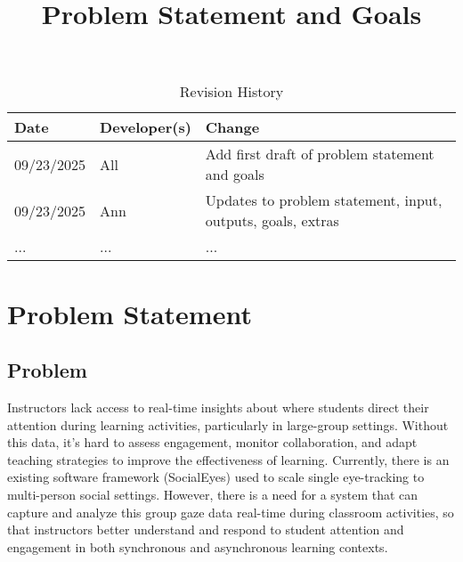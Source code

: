 \documentclass{article}
\title{Problem Statement and Goals\\\progname}
\author{\authname}
\date{}
\begin{document}
\maketitle

\begin{table}[hp]
\caption{Revision History} \label{TblRevisionHistory}
\begin{tabularx}{\textwidth}{llX}
\toprule
\textbf{Date} & \textbf{Developer(s)} & \textbf{Change}\\
\midrule
09/23/2025 & All & Add first draft of problem statement and goals\\
09/23/2025 & Ann & Updates to problem statement, input, outputs, goals, extras\\
... & ... & ...\\
\bottomrule
\end{tabularx}
\end{table}

\section{Problem Statement}
\subsection{Problem}
Instructors lack access to real-time insights about where students direct their attention during learning activities, particularly in large-group settings. Without this data, it's hard to assess engagement, monitor collaboration, and adapt teaching strategies to improve the effectiveness of learning. Currently, there is an existing software framework (SocialEyes) used to scale single eye-tracking to multi-person social settings. However, there is a need for a system that can capture and analyze this group gaze data real-time during classroom activities, so that instructors better understand and respond to student attention and engagement in both synchronous and asynchronous learning contexts. 
\end{document}

